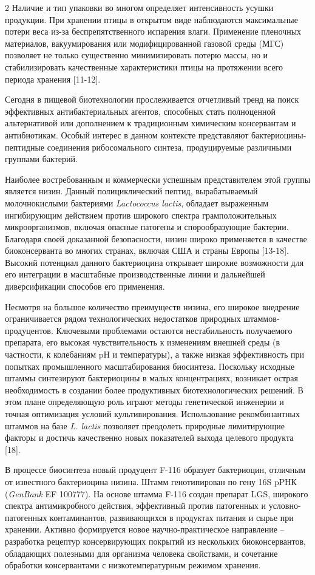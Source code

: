 \begin{multicols}{2}
Наличие и тип упаковки во многом определяет интенсивность усушки
продукции. При хранении птицы в открытом виде наблюдаются максимальные
потери веса из-за беспрепятственного испарения влаги. Применение
пленочных материалов, вакуумирования или модифицированной газовой среды
(МГС) позволяет не только существенно минимизировать потерю массы, но и
стабилизировать качественные характеристики птицы на протяжении всего
периода хранения {[}11-12{]}.

Сегодня в пищевой биотехнологии прослеживается отчетливый тренд на поиск
эффективных антибактериальных агентов, способных стать полноценной
альтернативой или дополнением к традиционным химическим консервантам и
антибиотикам. Особый интерес в данном контексте представляют
бактериоцины-пептидные соединения рибосомального синтеза, продуцируемые
различными группами бактерий.

Наиболее востребованным и коммерчески успешным представителем этой
группы является низин. Данный полициклический пептид, вырабатываемый
молочнокислыми бактериями \emph{Lactococcus lactis}, обладает выраженным
ингибирующим действием против широкого спектра грамположительных
микроорганизмов, включая опасные патогены и спорообразующие бактерии.
Благодаря своей доказанной безопасности, низин широко применяется в
качестве биоконсерванта во многих странах, включая США и страны Европы
{[}13-18{]}. Высокий потенциал данного бактериоцина открывает широкие
возможности для его интеграции в масштабные производственные линии и
дальнейшей диверсификации способов его применения.

Несмотря на большое количество преимуществ низина, его широкое внедрение
ограничивается рядом технологических недостатков природных
штаммов-продуцентов. Ключевыми проблемами остаются нестабильность
получаемого препарата, его высокая чувствительность к изменениям внешней
среды (в частности, к колебаниям pH и температуры), а также низкая
эффективность при попытках промышленного масштабирования биосинтеза.
Поскольку исходные штаммы синтезируют бактериоцины в малых
концентрациях, возникает острая необходимость в создании более
продуктивных биотехнологических решений. В этом плане определяющую роль
играют методы генетической инженерии и точная оптимизация условий
культивирования. Использование рекомбинантных штаммов на базе \emph{L.
lactis} позволяет преодолеть природные лимитирующие факторы и достичь
качественно новых показателей выхода целевого продукта {[}18{]}.

В процессе биосинтеза новый продуцент F-116 образует бактериоцин,
отличным от известного бактериоцина низина. Штамм генотипирован по гену
16S pPНК (\emph{GenBank} EF 100777). На основе штамма F-116 создан
препарат LGS, широкого спектра антимикробного действия, эффективный
против патогенных и условно-патогенных контаминантов, развивающихся в
продуктах питания и сырье при хранении. Активно формируется новое
научно-практическое направление -- разработка рецептур консервирующих
покрытий из нескольких биоконсервантов, обладающих полезными для
организма человека свойствами, и сочетание обработки консервантами с
низкотемпературным режимом хранения.


\end{multicols}
